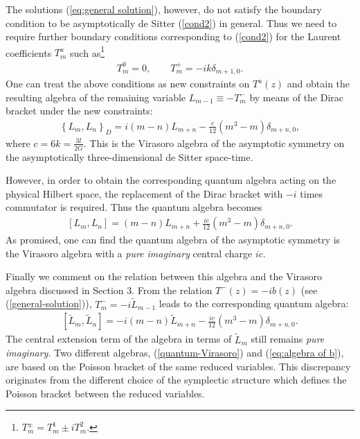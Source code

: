 \documentclass[a4paper,11pt]{article}
\begin{document}
The solutions (\ref{eq:general solution}), however,
do not satisfy the boundary condition to be asymptotically de Sitter
(\ref{cond2}) in general. Thus we need to require further boundary conditions 
corresponding to (\ref{cond2}) for the Laurent coefficients $T_{m}^{a}$ 
such as\footnote{$T_{m}^{\pm}=T_{m}^{1}\pm i T_{m}^{2}$.}
\begin{eqnarray}
T_{m}^{0}=0, \qquad T_{m}^{+}=-ik \delta_{m+1, 0}.
\end{eqnarray}
One can treat the above conditions as new constraints on $T^{a}(z)$
and obtain the resulting algebra of the remaining variable
$L_{m-1}\equiv -T_{m}^{-}$ by means of the Dirac bracket 
under the new constraints:
\begin{eqnarray}
\left\{L_{m}, L_{n}\right\}_{D}=i (m-n) L_{m+n} -\frac{c}{12}(m^{3}-m)
\delta_{m+n,0}, 
\label{eq:Dirac of Virasoro}
\end{eqnarray}
where $c=6k=\frac{3l}{2G}$.
This is the Virasoro algebra of the asymptotic symmetry on
the asymptotically three-dimensional de Sitter space-time.

However, in order to obtain the corresponding 
quantum algebra acting on the physical Hilbert space, the replacement of 
the Dirac bracket with $-i$ times commutator is required.
Thus the quantum algebra becomes
\begin{eqnarray}
\left[L_{m}, L_{n}\right] = (m-n) L_{m+n} +\frac{i c}{12}
(m^{3}-m)\delta_{m+n,0}.
\end{eqnarray}
As promised, one can find the quantum algebra of the asymptotic
symmetry is the Virasoro algebra with a {\it pure imaginary} central 
charge $i c$. 

Finally we comment on the relation between this algebra and the Virasoro
algebra discussed in Section 3. From the relation $T^{-}(z) = -i b(z)$
(see (\ref{general-solution})), $T^{-}_{m} = -i\tilde{L}_{m-1}$ leads to
the corresponding quantum algebra:
\begin{eqnarray}
\left[\tilde{L}_{m}, \tilde{L}_{n}\right] = -i (m-n) \tilde{L}_{m+n} - 
\frac{i c}{12}(m^{3}-m)\delta_{m+n,0}.
\label{eq:algebra of b}    
\end{eqnarray}
The central extension term of the algebra in terms of $\tilde{L}_{m}$
still remains {\it pure imaginary}.
Two different algebras, (\ref{quantum-Virasoro}) 
and (\ref{eq:algebra of b}), are based on
the Poisson bracket of the same reduced variables. 
This discrepancy originates from the different choice of
the symplectic structure which defines the Poisson bracket 
between the reduced variables.
\end{document}
